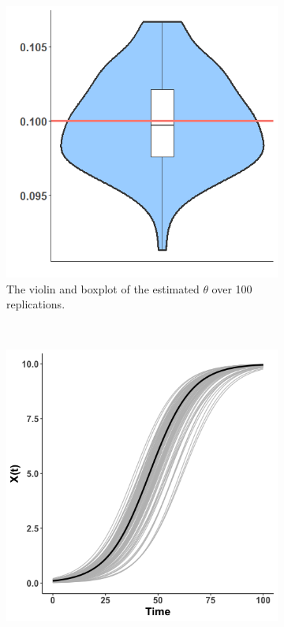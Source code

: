 \begin{figure}[H]
    \centering
    \begin{subfigure}[t]{0.5\textwidth}
        \centering
        \includegraphics[width=\textwidth]{simple_ode_estpar.png}
        \caption{The violin and boxplot of the estimated $\theta$ over 100 replications.}
    \end{subfigure}%
    ~ 
    \begin{subfigure}[t]{0.5\textwidth}
        \centering
        \includegraphics[width=\textwidth]{simple_ode_solve.png}

\end{subfigure}
\end{figure}
